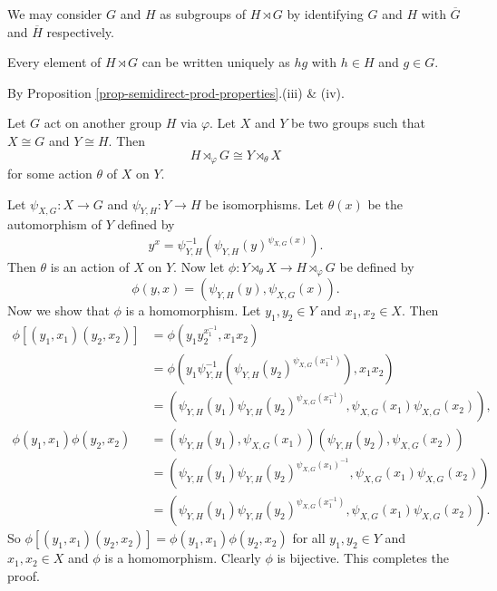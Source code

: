 \begin{remark}
	We may consider $G$ and $H$ as subgroups of $H \rtimes G$ by identifying $G$ and $H$ with $\overline{G}$ and $\overline{H}$ respectively.
\end{remark}
\begin{corollary}
	Every element of $H \rtimes G$ can be written uniquely as $hg$ with $h\in H$ and $g\in G$.
\end{corollary}
\begin{sketch}
	By Proposition \ref{prop-semidirect-prod-properties}.(iii) \& (iv).
\end{sketch}
\begin{proposition} \label{prop-semidirect-prod-isom}
	Let $G$ act on another group $H$ via $\varphi$. Let $X$ and $Y$ be two groups such that $X\cong G$ and $Y\cong H$. Then $$ H\rtimes_{\varphi} G \cong Y\rtimes_{\theta} X$$ for some action $\theta$ of $X$ on $Y$.
\end{proposition}
\begin{sketch}
	Let $\psi_{X,G}:X\rightarrow G$ and $\psi_{Y,H}:Y\rightarrow H$ be isomorphisms. 
	Let $\theta(x)$ be the automorphism of $Y$ defined by 
	\begin{equation*}
		y^{x} = \psi_{Y,H}^{-1}(\psi_{Y,H}(y)^{\psi_{X,G}(x)}).
	\end{equation*}
	Then $\theta$ is an action of $X$ on $Y$. Now let $\phi: Y\rtimes_{\theta} X \to H\rtimes_{\varphi} G$ be defined by
	\begin{equation*}
		\phi(y,x) = (\psi_{Y,H}(y), \psi_{X,G}(x)).
	\end{equation*}
	Now we show that $\phi$ is a homomorphism. Let $y_1,y_2\in Y$ and $x_1,x_2\in X$. Then
	\begin{align*}
		\phi[(y_1,x_1)(y_2,x_2)] &= \phi(y_1y_2^{x_1^{-1}},x_1x_2) 
		\\
		&= \phi\left(y_1\psi_{Y,H}^{-1}(\psi_{Y,H}(y_2)^{\psi_{X,G}(x_1^{-1})}),x_1x_2\right) 
		\\
		&= \left(\psi_{Y,H}(y_1)\psi_{Y,H}(y_2)^{\psi_{X,G}(x_1^{-1})},\psi_{X,G}(x_1)\psi_{X,G}(x_2)\right),
		\\
		\phi(y_1,x_1)\phi(y_2,x_2) &=(\psi_{Y,H}(y_1),\psi_{X,G}(x_1))(\psi_{Y,H}(y_2),\psi_{X,G}(x_2))
		\\
		&= \left(\psi_{Y,H}(y_1)\psi_{Y,H}(y_2)^{\psi_{X,G}(x_1)^{-1}}, \psi_{X,G}(x_1)\psi_{X,G}(x_2)\right)
		\\
		&= \left(\psi_{Y,H}(y_1)\psi_{Y,H}(y_2)^{\psi_{X,G}(x_1^{-1})}, \psi_{X,G}(x_1)\psi_{X,G}(x_2)\right).
	\end{align*}
	So $\phi[(y_1,x_1)(y_2,x_2)] = \phi(y_1,x_1)\phi(y_2,x_2)$ for all $y_1,y_2\in Y$ and $x_1,x_2\in X$ and $\phi$ is a homomorphism. Clearly $\phi$ is bijective. This completes the proof.
\end{sketch}
